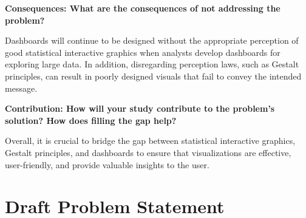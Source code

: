 \documentclass[print]{nuthesis}
\begin{document}
\textbf{Consequences: What are the consequences of not addressing the problem?}

Dashboards will continue to be designed without the appropriate perception of good statistical interactive graphics when analysts develop dashboards for exploring large data.
In addition, disregarding perception laws, such as Gestalt principles, can result in poorly designed visuals that fail to convey the intended message.

\textbf{Contribution: How will your study contribute to the problem's solution? How does filling the gap help?}

Overall, it is crucial to bridge the gap between statistical interactive graphics, Gestalt principles, and dashboards to ensure that visualizations are effective, user-friendly, and provide valuable insights to the user.

\hypertarget{draft-problem-statement}{%
\chapter{Draft Problem Statement}\label{draft-problem-statement}}
\end{document}
